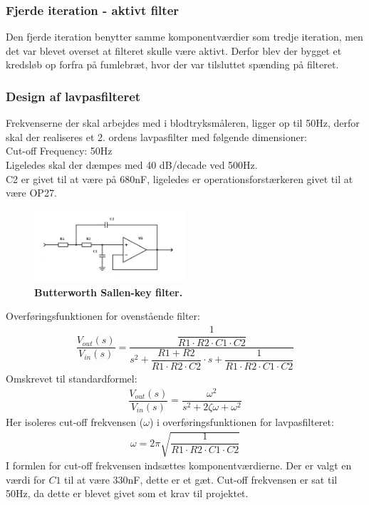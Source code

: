 \subsubsection{Fjerde iteration - aktivt filter}
Den fjerde iteration benytter samme komponentværdier som tredje iteration, men det var blevet overset at filteret skulle være aktivt. Derfor blev der bygget et kredsløb op forfra på fumlebræt, hvor der var tilsluttet spænding på filteret.
\subsubsection{Design af lavpasfilteret}
Frekvenserne der skal arbejdes med i blodtryksmåleren, ligger op til 50Hz, derfor skal der realiseres et 2. ordens lavpasfilter med følgende dimensioner:\\
Cut-off Frequency: 50Hz\\
Ligeledes skal der dæmpes med 40 dB/decade ved 500Hz.\\
C2 er givet til at være på 680nF, ligeledes er operationsforstærkeren givet til at være OP27.
\begin{figure}[H]
\includegraphics[width =0.5\textwidth , center]{billeder/lavpas}
\caption{\textbf{Butterworth Sallen-key filter.}}
\end{figure}
Overføringsfunktionen for ovenstående filter:
\begin{align}
\dfrac{V_{out}(s)}{V_{in}(s)}=\dfrac{\dfrac{1}{R1\cdot R2\cdot C1\cdot C2}}{s^2+\dfrac{R1 + R2}{R1\cdot R2\cdot C2}\cdot s+\dfrac{1}{R1\cdot R2\cdot C1\cdot C2}}
\end{align}
Omskrevet til standardformel:
\begin{align}
\dfrac{V_{out}(s)}{V_{in}(s)}=\dfrac{\omega^2}{s^2+2\zeta\omega+\omega^2}
\end{align}
Her isoleres cut-off frekvensen ($\omega$) i overføringsfunktionen for lavpasfilteret:
\begin{align}
\omega = 2\pi\sqrt{\dfrac{1}{R1\cdot R2\cdot C1\cdot C2}}
\end{align}
I formlen for cut-off frekvensen indsættes komponentværdierne. Der er valgt en værdi for $C1$ til at være 330nF, dette er et gæt. Cut-off frekvensen er sat til 50Hz, da dette er blevet givet som et krav til projektet.\\
